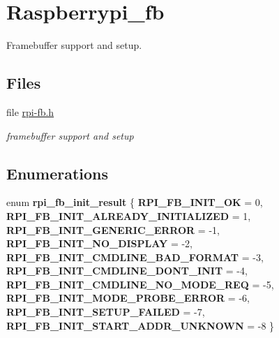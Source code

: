 \hypertarget{group__raspberrypi__fb}{}\section{Raspberrypi\+\_\+fb}
\label{group__raspberrypi__fb}


Framebuffer support and setup.  


\subsection*{Files}
\begin{DoxyCompactItemize}
\item 
file \mbox{\hyperlink{rpi-fb_8h}{rpi-\/fb.\+h}}
\begin{DoxyCompactList}\small\item\em framebuffer support and setup \end{DoxyCompactList}\end{DoxyCompactItemize}
\subsection*{Enumerations}
\begin{DoxyCompactItemize}
\item 
\mbox{\label{group__raspberrypi__fb_gad943f8078ec2ef7e8783fdcc08126f0c}} 
enum {\bfseries rpi\+\_\+fb\+\_\+init\+\_\+result} \{ \newline
{\bfseries R\+P\+I\+\_\+\+F\+B\+\_\+\+I\+N\+I\+T\+\_\+\+OK} = 0, 
{\bfseries R\+P\+I\+\_\+\+F\+B\+\_\+\+I\+N\+I\+T\+\_\+\+A\+L\+R\+E\+A\+D\+Y\+\_\+\+I\+N\+I\+T\+I\+A\+L\+I\+Z\+ED} = 1, 
{\bfseries R\+P\+I\+\_\+\+F\+B\+\_\+\+I\+N\+I\+T\+\_\+\+G\+E\+N\+E\+R\+I\+C\+\_\+\+E\+R\+R\+OR} = -\/1, 
{\bfseries R\+P\+I\+\_\+\+F\+B\+\_\+\+I\+N\+I\+T\+\_\+\+N\+O\+\_\+\+D\+I\+S\+P\+L\+AY} = -\/2, 
\newline
{\bfseries R\+P\+I\+\_\+\+F\+B\+\_\+\+I\+N\+I\+T\+\_\+\+C\+M\+D\+L\+I\+N\+E\+\_\+\+B\+A\+D\+\_\+\+F\+O\+R\+M\+AT} = -\/3, 
{\bfseries R\+P\+I\+\_\+\+F\+B\+\_\+\+I\+N\+I\+T\+\_\+\+C\+M\+D\+L\+I\+N\+E\+\_\+\+D\+O\+N\+T\+\_\+\+I\+N\+IT} = -\/4, 
{\bfseries R\+P\+I\+\_\+\+F\+B\+\_\+\+I\+N\+I\+T\+\_\+\+C\+M\+D\+L\+I\+N\+E\+\_\+\+N\+O\+\_\+\+M\+O\+D\+E\+\_\+\+R\+EQ} = -\/5, 
{\bfseries R\+P\+I\+\_\+\+F\+B\+\_\+\+I\+N\+I\+T\+\_\+\+M\+O\+D\+E\+\_\+\+P\+R\+O\+B\+E\+\_\+\+E\+R\+R\+OR} = -\/6, 
\newline
{\bfseries R\+P\+I\+\_\+\+F\+B\+\_\+\+I\+N\+I\+T\+\_\+\+S\+E\+T\+U\+P\+\_\+\+F\+A\+I\+L\+ED} = -\/7, 
{\bfseries R\+P\+I\+\_\+\+F\+B\+\_\+\+I\+N\+I\+T\+\_\+\+S\+T\+A\+R\+T\+\_\+\+A\+D\+D\+R\+\_\+\+U\+N\+K\+N\+O\+WN} = -\/8
 \}
\end{DoxyCompactItemize}
